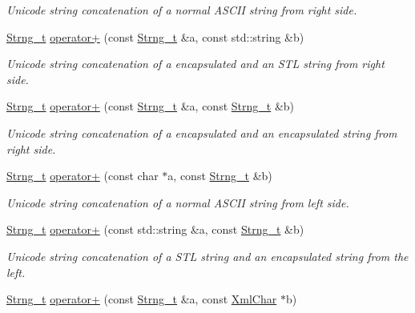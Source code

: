\begin{DoxyCompactItemize}
\begin{DoxyCompactList}\small\item\em Unicode string concatenation of a normal A\+S\+C\+II string from right side. \end{DoxyCompactList}\item 
\hyperlink{class_d_d4hep_1_1_x_m_l_1_1_strng__t}{Strng\+\_\+t} \hyperlink{group___d_d4_h_e_p___x_m_l_gaf514b02eb314678df1b7149c4f0025b2}{operator+} (const \hyperlink{class_d_d4hep_1_1_x_m_l_1_1_strng__t}{Strng\+\_\+t} \&a, const std\+::string \&b)
\begin{DoxyCompactList}\small\item\em Unicode string concatenation of a encapsulated and an S\+TL string from right side. \end{DoxyCompactList}\item 
\hyperlink{class_d_d4hep_1_1_x_m_l_1_1_strng__t}{Strng\+\_\+t} \hyperlink{group___d_d4_h_e_p___x_m_l_ga16907b7f06827dc354d29834328834f8}{operator+} (const \hyperlink{class_d_d4hep_1_1_x_m_l_1_1_strng__t}{Strng\+\_\+t} \&a, const \hyperlink{class_d_d4hep_1_1_x_m_l_1_1_strng__t}{Strng\+\_\+t} \&b)
\begin{DoxyCompactList}\small\item\em Unicode string concatenation of a encapsulated and an encapsulated string from right side. \end{DoxyCompactList}\item 
\hyperlink{class_d_d4hep_1_1_x_m_l_1_1_strng__t}{Strng\+\_\+t} \hyperlink{group___d_d4_h_e_p___x_m_l_gad9d4f784bd934ca00c54efe28b42c7d2}{operator+} (const char $\ast$a, const \hyperlink{class_d_d4hep_1_1_x_m_l_1_1_strng__t}{Strng\+\_\+t} \&b)
\begin{DoxyCompactList}\small\item\em Unicode string concatenation of a normal A\+S\+C\+II string from left side. \end{DoxyCompactList}\item 
\hyperlink{class_d_d4hep_1_1_x_m_l_1_1_strng__t}{Strng\+\_\+t} \hyperlink{group___d_d4_h_e_p___x_m_l_gab7183a795b02243de6de9f3cd3665cb0}{operator+} (const std\+::string \&a, const \hyperlink{class_d_d4hep_1_1_x_m_l_1_1_strng__t}{Strng\+\_\+t} \&b)
\begin{DoxyCompactList}\small\item\em Unicode string concatenation of a S\+TL string and an encapsulated string from the left. \end{DoxyCompactList}\item 
\hyperlink{class_d_d4hep_1_1_x_m_l_1_1_strng__t}{Strng\+\_\+t} \hyperlink{group___d_d4_h_e_p___x_m_l_ga80dcfab5263e77bc2580f30c7d0e4f2e}{operator+} (const \hyperlink{class_d_d4hep_1_1_x_m_l_1_1_strng__t}{Strng\+\_\+t} \&a, const \hyperlink{namespace_d_d4hep_1_1_x_m_l_a09e5d9cc86ed782f6826dfe0778c1815}{Xml\+Char} $\ast$b)

\end{DoxyCompactItemize}
